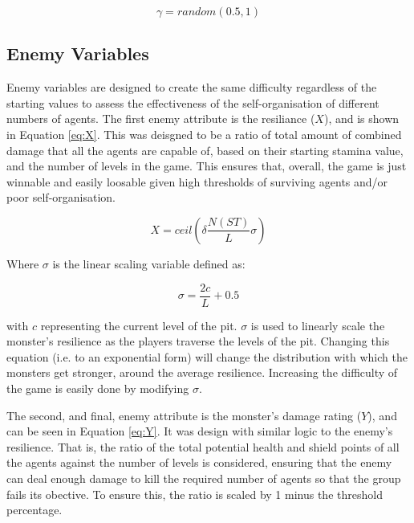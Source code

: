 \begin{equation}\label{eq:gamma}
    \gamma = random(0.5,1)
\end{equation}


\subsection{Enemy Variables}\label{sec: enemy}


Enemy variables are designed to create the same difficulty regardless of the starting values to assess the effectiveness of the self-organisation of different numbers of agents. The first enemy attribute is the resiliance ($X$), and is shown in Equation \ref{eq:X}. This was deisgned to be a ratio of total amount of combined damage that all the agents are capable of, based on their starting stamina value, and the number of levels in the game. This ensures that, overall, the game is just winnable and easily loosable given high thresholds of surviving agents and/or poor self-organisation. 

\begin{equation}\label{eq:X}
    X = ceil \left( \delta \frac{N(ST)}{L} \sigma \right)
\end{equation}

Where $\sigma$ is the linear scaling variable defined as:

\begin{equation}
    \sigma = \frac{2c}{L} + 0.5
\end{equation}

with $c$ representing the current level of the pit. $\sigma$ is used to linearly scale the monster's resilience as the players traverse the levels of the pit. Changing this equation (i.e. to an exponential form) will change the distribution with which the monsters get stronger, around the average resilience. Increasing the difficulty of the game is easily done by modifying $\sigma$.

The second, and final, enemy attribute is the monster's damage rating ($Y$), and can be seen in Equation \ref{eq:Y}. It was design with similar logic to the enemy's resilience. That is, the ratio of the total potential health and shield points of all the agents against the number of levels is considered, ensuring that the enemy can deal enough damage to kill the required number of agents so that the group fails its obective. To ensure this, the ratio is scaled by 1 minus the threshold percentage.  

